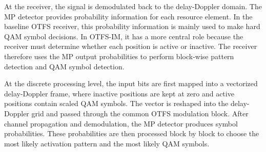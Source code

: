 At the receiver, the signal is demodulated back to the delay-Doppler domain. The MP detector provides probability information for each resource element. In the baseline OTFS receiver, this probability information is mainly used to make hard QAM symbol decisions. In OTFS-IM, it has a more central role because the receiver must determine whether each position is active or inactive. The receiver therefore uses the MP output probabilities to perform block-wise pattern detection and QAM symbol detection.

At the discrete processing level, the input bits are first mapped into a vectorized delay-Doppler frame, where inactive positions are kept at zero and active positions contain scaled QAM symbols. The vector is reshaped into the delay-Doppler grid and passed through the common OTFS modulation block. After channel propagation and demodulation, the MP detector produces symbol probabilities. These probabilities are then processed block by block to choose the most likely activation pattern and the most likely QAM symbols.


